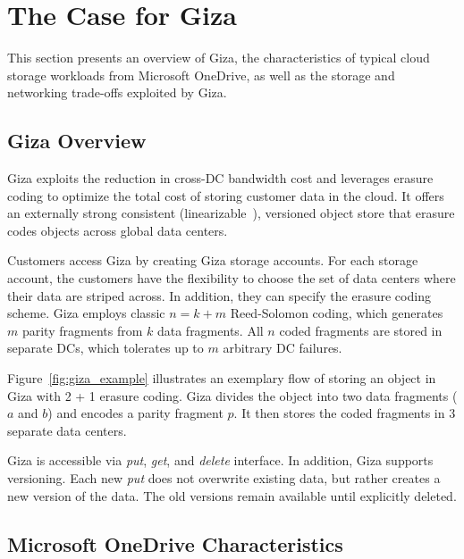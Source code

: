 
\section{The Case for Giza}
\label{sec:motivation}


This section presents an overview of Giza, 
the characteristics of typical cloud storage workloads from Microsoft OneDrive,
as well as the storage and networking trade-offs exploited by Giza.


\subsection{Giza Overview}

Giza exploits the reduction in cross-DC bandwidth cost and leverages erasure
coding to optimize the total cost of storing customer data in the cloud. It
offers an externally strong consistent
(linearizable~\cite{herlihy90linearizability}), versioned object store that
erasure codes objects across global data centers.

Customers access Giza by creating Giza storage accounts. For each storage
account, the customers have the flexibility to choose the set of data centers
where their data are striped across. In addition, they can specify the erasure
coding scheme. Giza employs classic $n = k + m$ Reed-Solomon coding, which
generates $m$ parity fragments from $k$ data fragments. All $n$ coded fragments
are stored in separate DCs, which tolerates up to $m$ arbitrary DC failures.

Figure~\ref{fig:giza_example} illustrates an exemplary flow of storing an object
in Giza with 2 + 1 erasure coding. Giza divides the object into two data
fragments ($a$ and $b$) and encodes a parity fragment $p$. It then stores the
coded fragments in $3$ separate data centers.

Giza is accessible via {\em put}, {\em get}, and {\em delete} interface. In
addition, Giza supports versioning. Each new {\em put} does not overwrite
existing data, but rather creates a new version of the data. The old versions
remain available until explicitly deleted.

\subsection{Microsoft OneDrive Characteristics}
\label{sec:onedrive}

